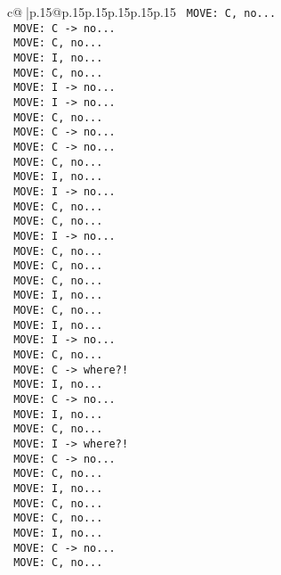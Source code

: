 \documentclass{article}
\begin{document}
{\begin{supertabular}{c@{$\;$}|p{.15\linewidth}@{}p{.15\linewidth}p{.15\linewidth}p{.15\linewidth}p{.15\linewidth}p{.15\linewidth}}
{{{\texttt{ MOVE: C, no...} \\
\texttt{ MOVE: C {-}> no...} \\
\texttt{ MOVE: C, no...} \\
\texttt{ MOVE: I, no...} \\
\texttt{ MOVE: C, no...} \\
\texttt{ MOVE: I {-}> no...} \\
\texttt{ MOVE: I {-}> no...} \\
\texttt{ MOVE: C, no...} \\
\texttt{ MOVE: C {-}> no...} \\
\texttt{ MOVE: C {-}> no...} \\
\texttt{ MOVE: C, no...} \\
\texttt{ MOVE: I, no...} \\
\texttt{ MOVE: I {-}> no...} \\
\texttt{ MOVE: C, no...} \\
\texttt{ MOVE: C, no...} \\
\texttt{ MOVE: I {-}> no...} \\
\texttt{ MOVE: C, no...} \\
\texttt{ MOVE: C, no...} \\
\texttt{ MOVE: C, no...} \\
\texttt{ MOVE: I, no...} \\
\texttt{ MOVE: C, no...} \\
\texttt{ MOVE: I, no...} \\
\texttt{ MOVE: I {-}> no...} \\
\texttt{ MOVE: C, no...} \\
\texttt{ MOVE: C {-}> where?!} \\
\texttt{ MOVE: I, no...} \\
\texttt{ MOVE: C {-}> no...} \\
\texttt{ MOVE: I, no...} \\
\texttt{ MOVE: C, no...} \\
\texttt{ MOVE: I {-}> where?!} \\
\texttt{ MOVE: C {-}> no...} \\
\texttt{ MOVE: C, no...} \\
\texttt{ MOVE: I, no...} \\
\texttt{ MOVE: C, no...} \\
\texttt{ MOVE: C, no...} \\
\texttt{ MOVE: I, no...} \\
\texttt{ MOVE: C {-}> no...} \\
\texttt{ MOVE: C, no...} \\
}}}
\end{supertabular}}
\end{document}

